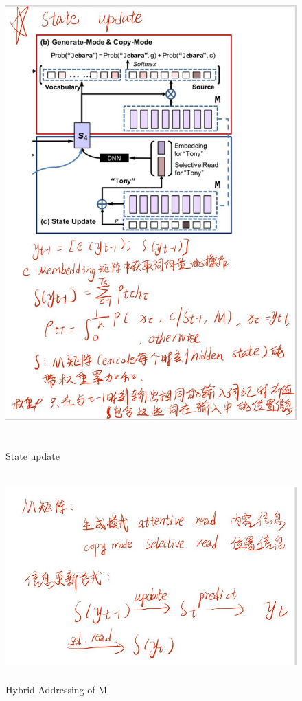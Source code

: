 \documentclass[UTF8]{ctexart}
\begin{document}
    \begin{figure}[htbp]
        \centering
        \vspace{-0.35cm} 
        \includegraphics[width=14cm,height=18cm]{pictures/su.jpg}
        \caption{State update}
    \end{figure}

    \begin{figure}[htbp]
        \centering
        \vspace{-0.35cm} 
        \includegraphics[width=14cm,height=8cm]{pictures/M.jpg}
        \caption{Hybrid Addressing of M}
    \end{figure}
\end{document}
